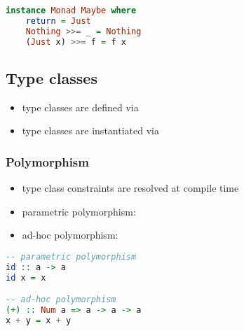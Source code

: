 \documentclass[a4paper,landscape,10pt]{article}
\begin{document}
\begin{multicols*}{2}
  \begin{lstlisting}[language=Haskell]
instance Monad Maybe where
    return = Just
    Nothing >>= _ = Nothing
    (Just x) >>= f = f x
\end{lstlisting}

  \breakcolumn

  \subsection{Type classes}

  \begin{itemize}
    \item type classes are defined via 
    \item type classes are instantiated via 
  \end{itemize}

  \subsubsection{Polymorphism}

  \begin{itemize}
    \item type class constraints are resolved at compile time
    \item parametric polymorphism: 
    \item ad-hoc polymorphism: 
  \end{itemize}

  \begin{lstlisting}[language=Haskell]
-- parametric polymorphism
id :: a -> a
id x = x

-- ad-hoc polymorphism
(+) :: Num a => a -> a -> a
x + y = x + y
  \end{lstlisting}

\end{multicols*}

\clearpage
\end{document}
